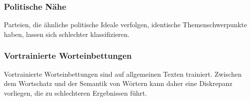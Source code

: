 \subsubsection{Politische Nähe}


Parteien, die ähnliche politische Ideale verfolgen, identische Themenschwerpunkte haben, lassen sich schlechter klassifizieren.

\subsubsection{Vortrainierte Worteinbettungen}

Vortrainierte Worteinbettungen sind auf allgemeinen Texten trainiert. Zwischen dem Wortschatz und der Semantik von Wörtern kann daher eine Diskrepanz vorliegen, die zu schlechteren Ergebnissen führt.

